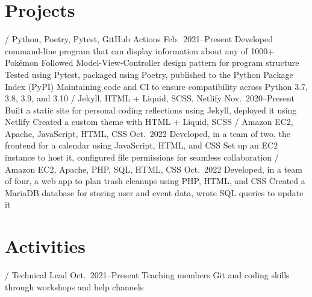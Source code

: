 \section{Projects}
\begin{doutline}
    \1[Pokésummary] / Python, Poetry, Pytest, GitHub Actions
    \hfill Feb.\ 2021--Present
        \2 Developed command-line program that can display information about any of 1000+ Pokémon
            \3 Followed Model-View-Controller design pattern for program structure
            \3 Tested using Pytest, packaged using Poetry, published to the Python Package Index (PyPI)
        \2 Maintaining code and CI to ensure compatibility across Python 3.7, 3.8, 3.9, and 3.10
     / Jekyll, HTML + Liquid, SCSS, Netlify
    \hfill Nov.\ 2020--Present
        \2 Built a static site for personal coding reflections using Jekyll, deployed it using Netlify
            \3 Created a custom theme with HTML + Liquid, SCSS
     / Amazon EC2, Apache, JavaScript, HTML, CSS
    \hfill Oct.\ 2022
        \2 Developed, in a team of two, the frontend for a calendar using JavaScript, HTML, and CSS
        \2 Set up an EC2 instance to host it, configured file permissions for seamless collaboration
    \1[Trashfree] / Amazon EC2, Apache, PHP, SQL, HTML, CSS
    \hfill Oct.\ 2022
        \2 Developed, in a team of four, a web app to plan trash cleanups using PHP, HTML, and CSS
        \2 Created a MariaDB database for storing user and event data, wrote SQL queries to update it
\end{doutline}

\section{Activities}
\begin{doutline}
     / Technical Lead
    \hfill Oct.\ 2021--Present
        \2 Teaching members Git and coding skills through workshops and help channels
\end{doutline}
